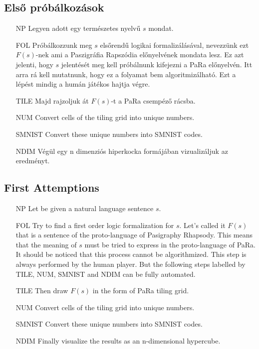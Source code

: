 \documentclass[a4paper]{article}
\theoremstyle{definition}
\begin{document}
\subsection{Els\H o próbálkozások}

\begin{itemize}
\item[NP] Legyen adott egy természetes nyelv\H u $s$ mondat.
\item[FOL] Próbálkozzunk meg $s$ els\H orend\H u logikai formalizálásával, 
nevezzünk ezt $F(s)$-nek ami a Paszigráfia Rapszódia el\H onyelvének mondata lesz. Ez azt jelenti, hogy $s$ jelentését meg kell próbálnunk kifejezni a PaRa el\H onyelvén. Itt arra rá kell mutatnunk, hogy ez a folyamat bem algoritmizálható. Ezt a lépést mindig a humán játékos hajtja végre.
\item[TILE] Majd rajzoljuk át $F(s)$-t a PaRa csempéz\H o rácsba.
\item[NUM] Convert cells of the tiling grid into unique numbers.
\item[SMNIST] Convert these unique numbers into SMNIST codes.
\item[NDIM] Végül egy n dimenziós hiperkocka formájában vizualizáljuk az eredményt.
\end{itemize}

\subsection{First Attemptions}

\begin{itemize}
\item[NP] Let be given a natural language sentence $s$.
\item[FOL] Try to find a first order logic formalization for $s$. Let's called it $F(s)$ that is a sentence of the proto-language of Pasigraphy Rhapsody. 
This means that the meaning of $s$ must be tried to express in the proto-language of PaRa. 
It should be noticed that this process cannot be algorithmized. 
This step is always performed by the human player. But the following steps labelled by TILE, NUM, SMNIST and NDIM can be fully automated.
\item[TILE] Then draw $F(s)$ in the form of PaRa tiling grid. 
\item[NUM] Convert cells of the tiling grid into unique numbers. 
\item[SMNIST] Convert these unique numbers into SMNIST codes.
\item[NDIM] Finally visualize the results as an n-dimensional hypercube.
\end{itemize}
\end{document}
